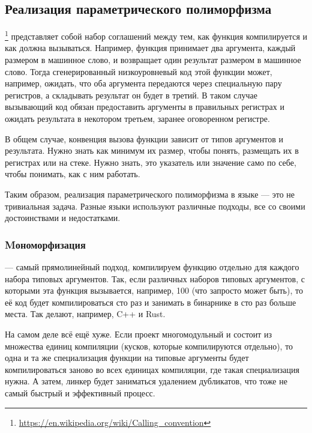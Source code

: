 \subsection{Реализация параметрического полиморфизма}

\footnote{\url{https://en.wikipedia.org/wiki/Calling_convention}} представляет собой набор соглашений между тем, как функция компилируется и как должна вызываться.
Например, функция принимает два аргумента, каждый размером в машинное слово, и возвращает один результат размером в машинное слово.
Тогда сгенерированный низкоуровневый код этой функции может, например, ожидать, что оба аргумента передаются через специальную пару регистров, а складывать результат он будет в третий.
В таком случае вызывающий код обязан предоставить аргументы в правильных регистрах и ожидать результата в некотором третьем, заранее оговоренном регистре.

В общем случае, конвенция вызова функции зависит от типов аргументов и результата.
Нужно знать как минимум их размер, чтобы понять, размещать их в регистрах или на стеке.
Нужно знать, это указатель или значение само по себе, чтобы понимать, как с ним работать.

Таким образом, реализация параметрического полиморфизма в языке --- это не тривиальная задача.
Разные языки используют различные подходы, все со своими достоинствами и недостатками.

\subsubsection{Mономорфизация} \label{subsubsec:monomorphization}

 --- самый прямолинейный подход, компилируем функцию отдельно для каждого набора типовых аргументов.
Так, если различных наборов типовых аргументов, с которыми эта функция вызывается, например, 100 (что запросто может быть), то её код будет компилироваться сто раз и занимать в бинарнике в сто раз больше места.
Так делают, например, C++ и Rust.

На самом деле всё ещё хуже.
Если проект многомодульный и состоит из множества единиц компиляции (кусков, которые компилируются отдельно), то одна и та же специализация функции на типовые аргументы будет компилироваться заново во всех единицах компиляции, где такая специализация нужна.
А затем, линкер будет заниматься удалением дубликатов, что тоже не самый быстрый и эффективный процесс.

